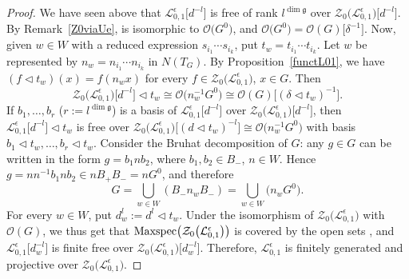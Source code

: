 \documentclass[pdftex]{sigma}
\numberwithin{equation}{section}
\theoremstyle{definition}
\newcommand{\e}{\epsilon}
\newcommand{\Ll}{{\mathcal L}}
\newcommand{\Oo}{{\mathcal O}}
\begin{document}
\begin{proof}
We have seen above that $\Ll_{0,1}^\e\big[d^{-l}\big]$ is free of rank $l^{\dim \mathfrak{g}}$ over $\mathcal{Z}_0\bigl(\Ll_{0,1}^\e\bigr)\big[d^{-l}\big]$. By Remark~\ref{Z0viaUe}, \smash{$\mathcal{Z}_0\bigl(\Ll_{0,1}^\e\bigr)\big[d^{-l}\big]\cong \mathcal{Z}_0\big(U_\e^{\rm lf}\big)\big[\ell^l\big]$} is isomorphic to $\Oo\big(G^0\big)$, and $\Oo\big(G^0\big) = \Oo(G)\big[\delta^{-1}\big]$. Now, given $w\in W$ with a reduced expression $s_{i_1}\cdots s_{i_k}$, put $t_w = t_{i_1}\cdots t_{i_k}$. Let $w$ be represented by $n_w = n_{i_1}\cdots n_{i_k}$ in $N(T_G)$. By Proposition~\ref{functL01}, we have $(f\lhd t_w)(x) = f(n_wx)$ for every $f\in \mathcal{Z}_0\bigl(\Ll_{0,1}^\e\bigr)$, $x\in G$. Then
\begin{equation}\label{BruhatactionX}
\mathcal{Z}_0\bigl(\Ll_{0,1}^\e\bigr)\big[d^{-l}\big]\lhd t_w \cong \Oo\big(n_{w}^{-1}G^0\big) \cong \Oo(G)\big[(\delta\lhd t_w)^{-1}\big].
\end{equation}
If $b_1,\dots,b_r$ \big($r:= l^{\dim \mathfrak{g}}$\big) is a basis of $\Ll_{0,1}^\e\big[d^{-l}\big]$ over $\mathcal{Z}_0\bigl(\Ll_{0,1}^\e\bigr)\big[d^{-l}\big]$, then $\Ll_{0,1}^\e\big[d^{-l}\big]\lhd t_w$ is free over $\mathcal{Z}_0\bigl(\Ll_{0,1}^\e\bigr)\big[(d\lhd t_w)^{-l}\big]\cong \Oo\big(n_{w}^{-1}G^0\big)$ with basis $b_1\lhd t_w,\dots,b_r\lhd t_w$. Consider the Bruhat decomposition of $G$: any $g\in G$ can be written in the form $g=b_1n b_2$, where $b_1,b_2\in B_-$, $n\in W$. Hence $g = nn^{-1}b_1nb_2\in nB_+B_- = nG^0$, and therefore%
\[G = \bigcup_{w\in W} (B_- n_w B_- )= \bigcup_{w\in W} \big(n_w G^0\big).\]
For every $w\in W$, put $d^l_w := d^{l}\lhd t_w$.
Under the isomorphism of $\mathcal{Z}_0\bigl(\Ll_{0,1}^\e\bigr)$ with $\Oo(G)$, we thus get that ${\rm Maxspec}\bigl(\mathcal{Z}_0\bigl(\Ll_{0,1}^\e\bigr)\bigr)$ is covered by the open sets , and $\Ll_{0,1}^\e\big[d_w^{-l}\big]$ is finite free over $\mathcal{Z}_0\bigl(\Ll_{0,1}^\e\bigr)\big[d_w^{-l}\big]$. Therefore, $\Ll_{0,1}^\e$ is finitely generated and projective over $\mathcal{Z}_0\bigl(\Ll_{0,1}^\e\bigr)$.


\end{proof}
\end{document}
